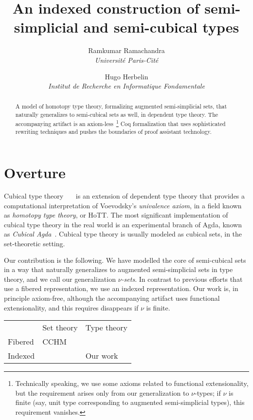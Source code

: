 \documentclass[10pt]{art}
\title{An indexed construction of semi-simplicial and semi-cubical types}
\author{
  \textcolor{gray80}{Ramkumar Ramachandra} \\
  \itshape \textcolor{gray80}{Université Paris-Cité}
  \and
  \textcolor{gray80}{Hugo Herbelin} \\
  \itshape \textcolor{gray80}{Institut de Recherche en Informatique Fondamentale}
}
\date{}
\def\graymidrule{\arrayrulecolor{gray30}\midrule\arrayrulecolor{gray65}}
\begin{document}
\thispagestyle{empty}
\maketitle
\begin{abstract}
  A model of homotopy type theory, formalizing augmented semi-simplicial sets, that naturally generalizes to semi-cubical sets as well, in dependent type theory. The accompanying artifact is an axiom-less~\footnote{Technically speaking, we use some axioms related to functional extensionality, but the requirement arises only from our generalization to $\nu$-types; if $\nu$ is finite (say, unit type corresponding to augmented semi-simplicial types), this requirement vanishes.} Coq formalization that uses sophisticated rewriting techniques and pushes the boundaries of proof assistant technology.
\end{abstract}
\tableofcontents
\newpage

\section{Overture}
Cubical type theory~\cite{Bezem14}~\cite{Cohen16}~\cite{Angiuli17} is an extension of dependent type theory that provides a computational interpretation of Voevodsky's \emph{univalence axiom}, in a field known as \emph{homotopy type theory}, or HoTT. The most significant implementation of cubical type theory in the real world is an experimental branch of Agda, known as \emph{Cubical Agda}~\cite{Vezzosi21}. Cubical type theory is usually modeled as cubical sets, in the set-theoretic setting.

Our contribution is the following. We have modelled the core of semi-cubical sets in a way that naturally generalizes to augmented semi-simplicial sets in type theory, and we call our generalization \emph{$\nu$-sets}. In contrast to previous efforts that use a fibered representation, we use an indexed representation. Our work is, in principle axiom-free, although the accompanying artifact uses functional extensionality, and this requires disappears if $\nu$ is finite.

\begin{table}[H]
  \begin{tabularx}{\linewidth}{p{.3\linewidth}|p{.3\linewidth}|p{.3\linewidth}}
    \toprule
            & Set theory & Type theory \\
    \graymidrule
    Fibered & CCHM       &             \\
    \graymidrule
    Indexed &            & Our work    \\
    \bottomrule
  \end{tabularx}
\end{table}
\end{document}
